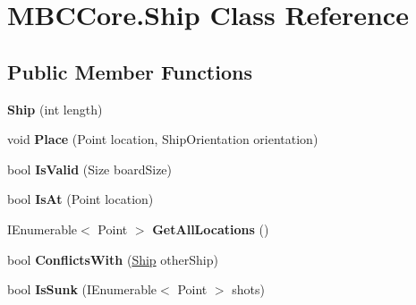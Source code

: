 \hypertarget{class_m_b_c_core_1_1_ship}{\section{M\-B\-C\-Core.\-Ship Class Reference}
\label{class_m_b_c_core_1_1_ship}
}
\subsection*{Public Member Functions}
\begin{DoxyCompactItemize}
\item 
\hypertarget{class_m_b_c_core_1_1_ship_a53cd975db9b82ac4226daed69dac1ac4}{{\bfseries Ship} (int length)}\label{class_m_b_c_core_1_1_ship_a53cd975db9b82ac4226daed69dac1ac4}

\item 
\hypertarget{class_m_b_c_core_1_1_ship_a7a0ca0507e227292e63a69585e7a2a59}{void {\bfseries Place} (Point location, Ship\-Orientation orientation)}\label{class_m_b_c_core_1_1_ship_a7a0ca0507e227292e63a69585e7a2a59}

\item 
\hypertarget{class_m_b_c_core_1_1_ship_a4415ca53e013f33d1d6c96d0218b90bc}{bool {\bfseries Is\-Valid} (Size board\-Size)}\label{class_m_b_c_core_1_1_ship_a4415ca53e013f33d1d6c96d0218b90bc}

\item 
\hypertarget{class_m_b_c_core_1_1_ship_ad3e139f30c811591b71a0c1104ff291e}{bool {\bfseries Is\-At} (Point location)}\label{class_m_b_c_core_1_1_ship_ad3e139f30c811591b71a0c1104ff291e}

\item 
\hypertarget{class_m_b_c_core_1_1_ship_a2fe11136048850207dba61e5b2b87502}{I\-Enumerable$<$ Point $>$ {\bfseries Get\-All\-Locations} ()}\label{class_m_b_c_core_1_1_ship_a2fe11136048850207dba61e5b2b87502}

\item 
\hypertarget{class_m_b_c_core_1_1_ship_acad5ab45e3379b7efebe4cd434f42884}{bool {\bfseries Conflicts\-With} (\hyperlink{class_m_b_c_core_1_1_ship}{Ship} other\-Ship)}\label{class_m_b_c_core_1_1_ship_acad5ab45e3379b7efebe4cd434f42884}

\item 
\hypertarget{class_m_b_c_core_1_1_ship_a376804f20bd80b5cbacca2fb80e55ada}{bool {\bfseries Is\-Sunk} (I\-Enumerable$<$ Point $>$ shots)}\label{class_m_b_c_core_1_1_ship_a376804f20bd80b5cbacca2fb80e55ada}

\end{DoxyCompactItemize}
